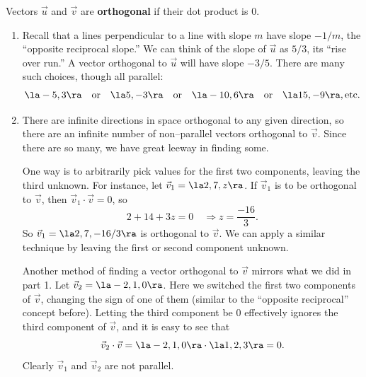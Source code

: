 {Vectors $\vec u$ and $\vec v$ are \textbf{orthogonal} if their dot product is 0.
}


{\begin{enumerate}
	\item Recall that a lines perpendicular to a line with slope $m$ have slope $-1/m$, the ``opposite reciprocal slope.'' We can think of the slope of $\vec u$ as $5/3$, its ``rise over run.'' A vector orthogonal to $\vec u$ will have slope $-3/5$. There are many such choices, though all parallel:
	$$\la -5,3\ra \quad \text{or} \quad\la 5,-3\ra \quad \text{or} \quad \la -10,6\ra\quad \text{or} \quad \la 15,-9\ra,\text{etc.}$$
	\item		There are infinite directions in space orthogonal to any given direction, so there are an infinite number of non--parallel vectors orthogonal to $\vec v$. Since there are so many, we have great leeway in finding some.
	
	One way is to arbitrarily pick values for the first two components, leaving the third unknown. For instance, let $\vec v_1 = \la 2,7,z\ra$. If $\vec v_1$ is to be orthogonal to $\vec v$, then $\vec v_1\cdot\vec v = 0$, so 
	$$2+14+3z=0 \quad \Rightarrow z = \frac{-16}{3}.$$
	So $\vec v_1 = \la 2, 7, -16/3\ra$ is orthogonal to $\vec v$. We can apply a similar technique by leaving the first or second component unknown.
	
	Another method of finding a vector orthogonal to $\vec v$ mirrors what we did in part 1. Let $\vec v_2 = \la-2,1,0\ra$. Here we switched the first two components of $\vec v$, changing the sign of one of them (similar to the ``opposite reciprocal'' concept before). Letting the third component be 0 effectively ignores the third component of $\vec v$, and it is easy to see that 
	$$\vec v_2\cdot\vec v = \la -2,1,0\ra\cdot\la 1,2,3\ra = 0.$$
	Clearly $\vec v_1$ and $\vec v_2$ are not parallel.
\end{enumerate}
\baselineskip
}\\

